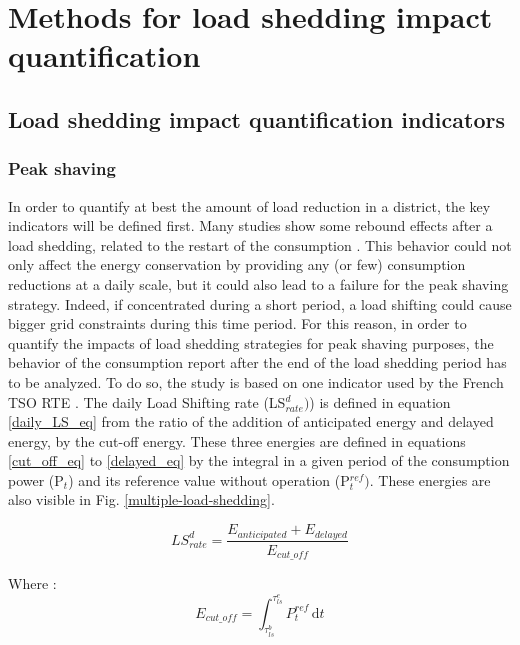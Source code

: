 \documentclass[buildings,article,submit,moreauthors,pdftex,10pt,a4paper]{mdpi}
\theoremstyle{mdpi}
\newcounter{re}
\theoremstyle{mdpidefinition}
\begin{document}
\section{Methods for load shedding impact quantification}

\subsection{Load shedding impact quantification indicators}

\subsubsection{Peak shaving}
In order to quantify at best the amount of load reduction in a district, the key indicators will be defined first. Many studies show some rebound effects after a load shedding, related to the restart of the consumption \cite{morales_assessment_2017}. This behavior could not only affect the energy conservation by providing any (or few) consumption reductions at a daily scale, but it could also lead to a failure for the peak shaving strategy. Indeed, if concentrated during a short period, a load shifting could cause bigger grid constraints during this time period.
For this reason, in order to quantify the impacts of load shedding strategies for peak shaving purposes, the behavior of the consumption report after the end of the load shedding period has to be analyzed. To do so, the study is based on one indicator used by the French TSO RTE \cite{RTE_rapport_report}. The daily Load Shifting rate (LS$_{rate}^{d})$) is defined in equation \ref{daily_LS_eq} from the ratio of the addition of anticipated energy and delayed energy, by the cut-off energy. These three energies are defined in equations \ref{cut_off_eq} to \ref{delayed_eq} by the integral in a given period of the consumption power (P$_{t}$) and its reference value without operation (P$^{ref}_{t})$. These energies are also visible in Fig. \ref{multiple-load-shedding}.

\begin{equation}
    \label{daily_LS_eq}
    LS_{rate}^{d} = \frac{E_{anticipated} + E_{delayed}}{E_{cut\_off}}
\end{equation}

Where :
\begin{equation}
\label{cut_off_eq}
E_{cut\_off} = \int_{\tau_{ls}^b}^{\tau_{ls}^e} P_{t}^{ref}\, \mathrm{d}t
\end{equation}
\end{document}
